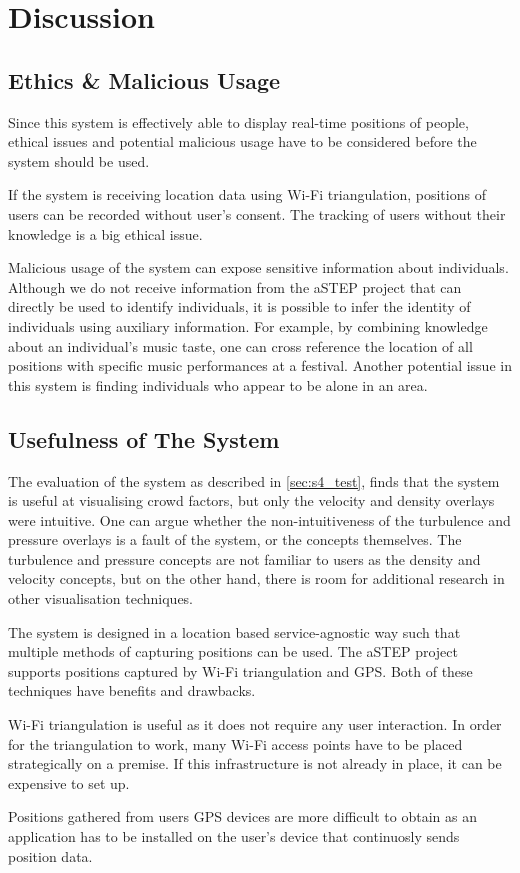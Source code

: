 \chapter{Discussion}


\section{Ethics \& Malicious Usage}
Since this system is effectively able to display real-time positions of people, ethical issues and potential malicious usage have to be considered before the system should be used. 

If the system is receiving location data using Wi-Fi triangulation, positions of users can be recorded without user's consent. The tracking of users without their knowledge is a big ethical issue.

Malicious usage of the system can expose sensitive information about individuals. Although we do not receive information from the aSTEP project that can directly be used to identify individuals, it is possible to infer the identity of individuals using auxiliary information. For example, by combining knowledge about an individual's music taste, one can cross reference the location of all positions with specific music performances at a festival. Another potential issue in this system is finding individuals who appear to be alone in an area. 

\section{Usefulness of The System}
The evaluation of the system as described in \cref{sec:s4_test}, finds that the system is useful at visualising crowd factors, but only the velocity and density overlays were intuitive. One can argue whether the non-intuitiveness of the turbulence and pressure overlays is a fault of the system, or the concepts themselves. The turbulence and pressure concepts are not familiar to users as the density and velocity concepts, but on the other hand, there is room for additional research in other visualisation techniques.


The system is designed in a location based service-agnostic way such that multiple methods of capturing positions can be used. The aSTEP project supports positions captured by Wi-Fi triangulation and GPS. Both of these techniques have benefits and drawbacks.

Wi-Fi triangulation is useful as it does not require any user interaction. In order for the triangulation to work, many Wi-Fi access points have to be placed strategically on a premise. If this infrastructure is not already in place, it can be expensive to set up.

Positions gathered from users GPS devices are more difficult to obtain as an application has to be installed on the user's device that continuosly sends position data.

